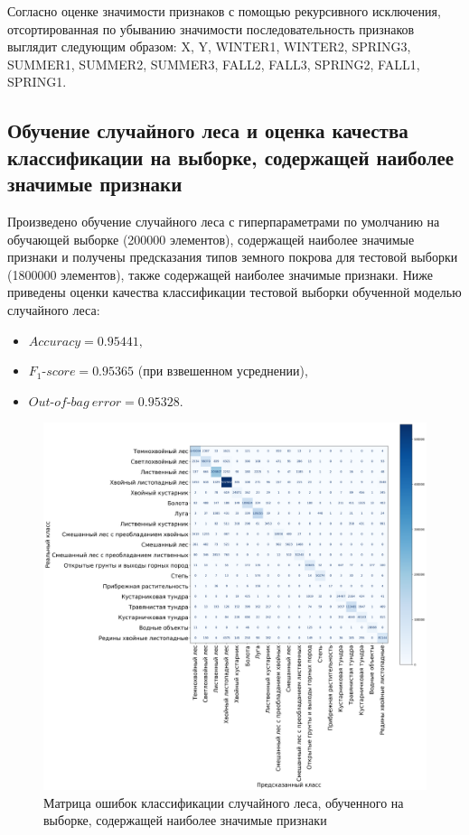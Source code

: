 \documentclass[14pt, a4paper, oneside]{extarticle}
\begin{document}
Согласно оценке значимости признаков с помощью рекурсивного исключения, отсортированная по убыванию значимости последовательность признаков выглядит следующим образом: X, Y, WINTER1, WINTER2, SPRING3, SUMMER1, SUMMER2, SUMMER3, FALL2, FALL3, SPRING2, FALL1, SPRING1.

\subsection{Обучение случайного леса и оценка качества классификации на выборке, содержащей наиболее значимые признаки}
Произведено обучение случайного леса с гиперпараметрами по умолчанию на обучающей выборке (200000 элементов), содержащей наиболее значимые признаки и получены предсказания типов земного покрова для тестовой выборки (1800000 элементов), также содержащей наиболее значимые признаки. Ниже приведены оценки качества классификации тестовой выборки обученной моделью случайного леса:
\begin{itemize}
    \item[] $Accuracy = 0.95441,$
    \item[] $F_1\mbox{-}score = 0.95365$ (при взвешенном усреднении),
    \item[] $Out\mbox{-}of\mbox{-}bag\ error = 0.95328.$
\end{itemize}

\begin{figure}[H]
    \caption{Матрица ошибок классификации случайного леса, обученного на выборке, содержащей наиболее значимые признаки}
    \centering
    \includegraphics[scale=0.27]{confusion-matrix-5}
\end{figure}
\end{document}
